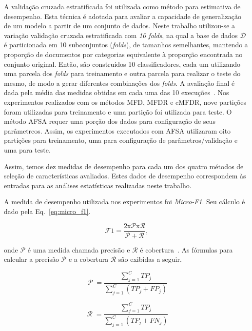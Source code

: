 \documentclass[conference]{IEEEtran}
\begin{document}
A validação cruzada estratificada foi utilizada como método para estimativa de desempenho.
Esta técnica é adotada para avaliar a capacidade de generalização de um modelo a partir de um conjunto de dados.
Neste trabalho utilizou-se a variação validação cruzada estratificada com \emph{10 folds}, na qual a base de dados $\mathcal{D}$ é particionada em 10 subconjuntos (\emph{folds}), de tamanhos semelhantes, mantendo a proporção de documentos por categorias equivalente à proporção encontrada no conjunto original. Então, são construídos 10 classificadores, cada um utilizando uma parcela dos \emph{folds} para treinamento e outra parcela para realizar o teste do mesmo, de modo a gerar diferentes combinações dos \emph{folds}.
A avaliação final é dada pela média das medidas obtidas em cada uma das 10 execuções~\cite{kohavi1995study}.
Nos experimentos realizados com os métodos MFD, MFDR e cMFDR, nove partições foram utilizadas para treinamento e uma partição foi utilizada para teste.
O método AFSA requer uma porção dos dados para configuração de seus parâmetreos. Assim, os experimentos executados com AFSA utilizaram oito partições para treinamento, uma para configuração de parâmetros/validação e uma para teste.

Assim, temos dez medidas de desempenho para cada um dos quatro métodos de seleção de características avaliados.
Estes dados de desempenho correspondem às entradas para as análises estatísticas realizadas neste trabalho.

A medida de desempenho utilizada nos experimentos foi \textit{Micro-F1}.
Seu cálculo é dado pela Eq.~\ref{eq:micro_f1}.

\begin{equation}
\operatorname{\mathcal{F}{1} = \frac{2 x \mathcal{P} x \mathcal{R}}{\mathcal{P} + \mathcal{R}}},
\label{eq:micro_f1}
\end{equation}

\noindent onde $\mathcal{P}$ é uma medida chamada precisão e $\mathcal{R}$ é cobertura~\cite{chang2008multilabel}. As fórmulas para calcular a precisão $\mathcal{P}$ e a cobertura $\mathcal{R}$ são exibidas a seguir.

\begin{equation}
\operatorname{\mathcal{P}} = \frac{\sum_{j=1}^{C}TP_j}{\sum_{j=1}^{C}(TP_j + FP_j)}
\label{eq:precision}
\end{equation}

\begin{equation}
\operatorname{\mathcal{R}} = \frac{\sum_{j=1}^{C}TP_j}{\sum_{j=1}^{C}(TP_j + FN_j)}
\label{eq:recall}
\end{equation}
\end{document}
